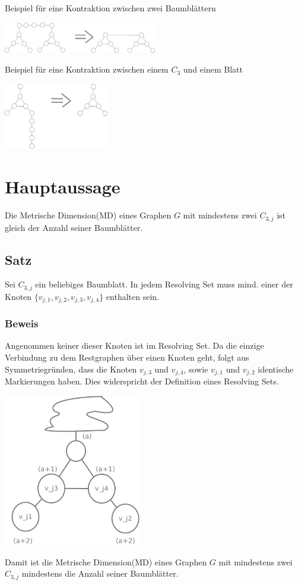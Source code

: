 \documentclass{article}
\begin{document}
Beispiel für eine Kontraktion zwischen zwei Baumblättern
\begin{center}
  \includegraphics[width=190pt]{impl2.pdf}
  \end{center}
  
Beispiel für eine Kontraktion zwischen einem $C_3$ und einem Blatt
\begin{center}
  \includegraphics[width=130pt]{impl.pdf}
  \end{center}

\section{Hauptaussage}
Die Metrische Dimension(MD) eines Graphen $G$ mit mindestens zwei $C_{3,j}$ ist gleich der Anzahl seiner Baumblätter.
\subsection{Satz}
Sei $C_{3,j}$ ein beliebiges Baumblatt. In jedem Resolving Set muss mind. einer der Knoten $\{v_{j,1},v_{j,2},v_{j,3},v_{j,4}\}$ enthalten sein.
\subsubsection{Beweis}
Angenommen keiner dieser Knoten ist im Resolving Set. Da die einzige Verbindung zu dem Restgraphen über einen Knoten geht, folgt aus Symmetriegründen, dass die Knoten $v_{j,3}$ und $v_{j,4}$, sowie $v_{j,1}$ und $v_{j,2}$ identische Markierungen haben. Dies widerspricht der Definition eines Resolving Sets.
\begin{center}
\includegraphics[width=170pt]{mm.pdf}
\end{center}
Damit ist die Metrische Dimension(MD) eines Graphen $G$ mit mindestens zwei $C_{3,j}$ mindestens die Anzahl seiner Baumblätter.
\end{document}
